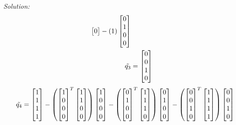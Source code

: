 \documentclass{article}
\newenvironment{solution}
    {\textit{Solution:}}
    {}
\begin{document}
\begin{solution}
\begin{align*}
\begin{bmatrix}
    0\end{bmatrix} - \left(1\right) \begin{bmatrix}0\\ 1\\ 0\\ 0\end{bmatrix}\\
    \Tilde{q_3} &= \begin{bmatrix}0\\ 0\\ 1\\ 0\end{bmatrix} \\
\end{align*}
\begin{align*}
    \Tilde{q_4} &= \begin{bmatrix}1\\ 1\\ 1\\ 1\end{bmatrix} - \left( \begin{bmatrix}1\\ 0\\ 0\\
    0\end{bmatrix}^T \begin{bmatrix}1\\ 1\\ 0\\ 0\end{bmatrix}\right) \begin{bmatrix}1\\ 0\\ 0\\
    0\end{bmatrix} - \left( \begin{bmatrix}0\\ 1\\ 0\\ 0\end{bmatrix}^T \begin{bmatrix}1\\ 1\\ 1\\ 0\end{bmatrix}\right) \begin{bmatrix}0\\ 1\\ 0\\ 0\end{bmatrix} - \left( \begin{bmatrix}0\\ 0\\ 1\\ 0\end{bmatrix}^T \begin{bmatrix}1\\ 1\\ 1\\ 1\end{bmatrix}\right) \begin{bmatrix}0\\ 0\\ 1\\ 0\end{bmatrix}\\

\end{align*}
\end{solution}
\end{document}
